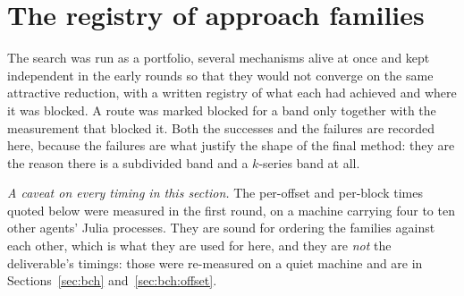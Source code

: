 \section{The registry of approach families}
\label{sec:reg}

The search was run as a portfolio, several mechanisms alive at once and kept independent
in the early rounds so that they would not converge on the same attractive reduction, with
a written registry of what each had achieved and where it was blocked. A route was marked
blocked for a band only together with the measurement that blocked it. Both the successes
and the failures are recorded here, because the failures are what justify the shape of the
final method: they are the reason there is a subdivided band and a $k$-series band at all.

\emph{A caveat on every timing in this section.} The per-offset and per-block times quoted
below were measured in the first round, on a machine carrying four to ten other agents'
Julia processes. They are sound for ordering the families against each other, which is what
they are used for here, and they are \emph{not} the deliverable's timings: those were
re-measured on a quiet machine and are in Sections~\ref{sec:bch} and~\ref{sec:bch:offset}.

